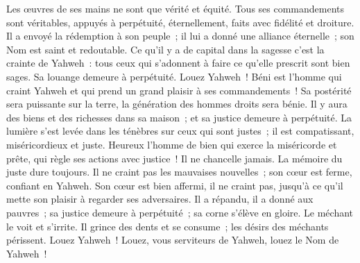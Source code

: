 \begin{multicols}{2}
 Les œuvres de ses mains ne sont que vérité et équité.  Tous ses commandements sont véritables,
 appuyés à perpétuité, éternellement,  faits avec fidélité et droiture.
 Il a envoyé la rédemption à son peuple~;  il lui a donné une alliance éternelle~;  son Nom est saint et redoutable.
 Ce qu'il y a de capital dans la sagesse c'est la crainte de Yahweh~:  tous ceux qui s'adonnent à faire ce qu'elle prescrit sont bien sages.  Sa louange demeure à perpétuité.
\VerseOne{}Louez Yahweh~!  Béni est l'homme qui craint Yahweh  et qui prend un grand plaisir à ses commandements~!
 Sa postérité sera puissante sur la terre,  la génération des hommes droits sera bénie.
 Il y aura des biens et des richesses dans sa maison~;  et sa justice demeure à perpétuité.
 La lumière s'est levée dans les ténèbres sur ceux qui sont justes~;  il est compatissant, miséricordieux et juste.
 Heureux l'homme de bien qui exerce la miséricorde et prête,  qui règle ses actions avec justice~!
 Il ne chancelle jamais.  La mémoire du juste dure toujours.
 Il ne craint pas les mauvaises nouvelles~;  son cœur est ferme, confiant en Yahweh.
 Son cœur est bien affermi, il ne craint pas,  jusqu'à ce qu'il mette son plaisir à regarder ses adversaires.
 Il a répandu, il a donné aux pauvres~;  sa justice demeure à perpétuité~;  sa corne s'élève en gloire.
 Le méchant le voit et s'irrite.  Il grince des dents et se consume~;  les désirs des méchants périssent.
\VerseOne{}Louez Yahweh~! Louez, vous serviteurs de Yahweh, louez le Nom de Yahweh~!

\end{multicols}
